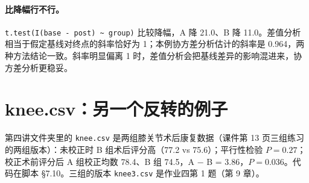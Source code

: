 \paragraph{比降幅行不行。}\Verb|t.test(I(base - post) ~ group)| 比较降幅，A 降 21.0、B 降 11.0。差值分析相当于假定基线对终点的斜率恰好为 1；本例协方差分析估计的斜率是 0.964，两种方法结论一致。斜率明显偏离 1 时，差值分析会把基线差异的影响混进来，协方差分析更稳妥。

\section{knee.csv：另一个反转的例子}
第四讲文件夹里的 \Verb|knee.csv| 是两组膝关节术后康复数据（课件第 13 页三组练习的两组版本）：未校正时 B 组术后评分高（77.2 vs 75.6）；平行性检验 $P=0.27$；校正术前评分后 A 组校正均数 78.4、B 组 74.5，A − B = 3.86，$P=0.036$。代码在脚本 §7.10。三组的版本 \Verb|knee3.csv| 是作业四第 1 题（第 9 章）。
